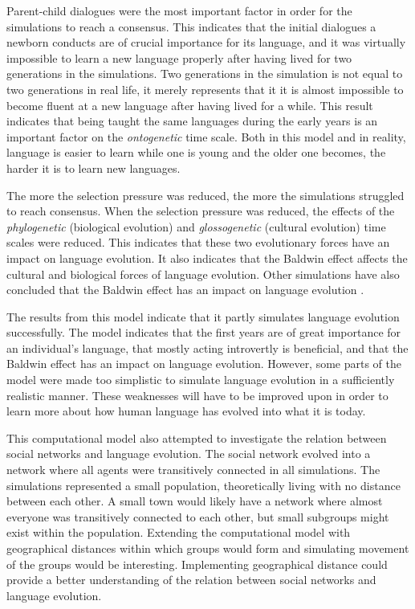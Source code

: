 Parent-child dialogues were the most important factor in order for the simulations to reach a consensus. This indicates that the initial dialogues a newborn conducts are of crucial importance for its language, and it was virtually impossible to learn a new language properly after having lived for two generations in the simulations. Two generations in the simulation is not equal to two generations in real life, it merely represents that it it is almost impossible to become fluent at a new language after having lived for a while. This result indicates that being taught the same languages during the early years is an important factor on the \textit{ontogenetic} time scale. Both in this model and in reality, language is easier to learn while one is young and the older one becomes, the harder it is to learn new languages.
 
The more the selection pressure was reduced, the more the simulations struggled to reach consensus. When the selection pressure was reduced, the effects of the \textit{phylogenetic} (biological evolution) and \textit{glossogenetic} (cultural evolution) time scales were reduced. This indicates that these two evolutionary forces have an impact on language evolution. It also indicates that the Baldwin effect \citep{baldwin1896new} affects the cultural and biological forces of language evolution. Other simulations have also concluded that the Baldwin effect has an impact on language evolution \citep{lipowska2011naming, zollman2010plasticity, chater2010language, lekvam2014agent}.

The results from this model indicate that it partly simulates language evolution successfully. The model indicates that the first years are of great importance for an individual's language, that mostly acting introvertly is beneficial, and that the Baldwin effect has an impact on language evolution. However, some parts of the model were made too simplistic to simulate language evolution in a sufficiently realistic manner. These weaknesses will have to be improved upon in order to learn more about how human language has evolved into what it is today.

This computational model also attempted to investigate the relation between social networks and language evolution. The social network evolved into a network where all agents were transitively connected in all simulations. The simulations represented a small population, theoretically living with no distance between each other. A small town would likely have a network where almost everyone was transitively connected to each other, but small subgroups might exist within the population. Extending the computational model with geographical distances within which groups would form and simulating movement of the groups would be interesting. Implementing geographical distance could provide a better understanding of the relation between social networks and language evolution.
 
